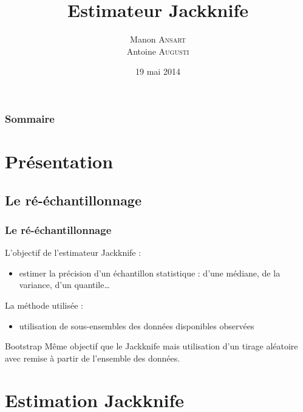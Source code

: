 \documentclass[handout]{beamer}
\title{
	Estimateur Jackknife
}
\author{
	Manon \textsc{Ansart} \\
	\vspace{10px}
	Antoine \textsc{Augusti}
}
\date{19 mai 2014}
\begin{document}
	\begin{frame}[plain]
		\titlepage
	\end{frame}

	\begin{frame}[plain]
		\frametitle{Sommaire}
		\tableofcontents
	\end{frame}


	\section{Présentation}

		\subsection{Le ré-échantillonnage}
		\begin{frame}
			\frametitle{Le ré-échantillonnage}

			L'objectif de l'estimateur Jackknife :
			\begin{itemize}
				\item estimer la précision d'un échantillon statistique : d'une médiane, de la variance, d'un quantile\dots
			\end{itemize}

			\vspace{15px}

			La méthode utilisée :
			\begin{itemize}
				\item utilisation de sous-ensembles des données disponibles observées
			\end{itemize}

			\vspace{20px}

			\begin{exampleblock}{Bootstrap}
				Même objectif que le Jackknife mais utilisation d'un tirage aléatoire avec remise à partir de l'ensemble des données.
			\end{exampleblock}
		\end{frame}

	\section{Estimation Jackknife}
\end{document}
